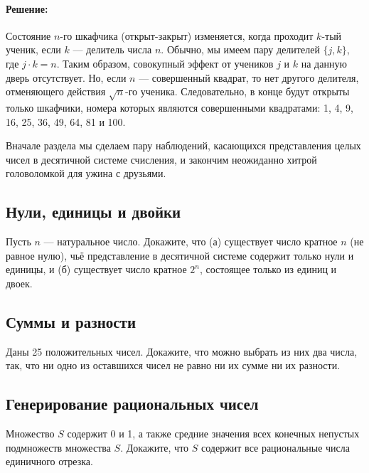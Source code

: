 \paragraph{Решение:}

Состояние $n$-го шкафчика (открыт-закрыт) изменяется, когда проходит $k$-тый ученик, если $k$ --- делитель числа $n$.
Обычно, мы имеем пару делителей $\{j,k\}$, где $j\cdot k=n$. 
Таким образом, совокупный эффект от учеников $j$ и $k$ на данную дверь отсутствует. %
Но, если $n$ --- совершенный квадрат, то нет другого делителя, отменяющего действия $\sqrt{n}$-го ученика. 
Следовательно, в конце будут открыты только шкафчики, номера которых являются совершенными квадратами: 1, 4, 9, 16, 25, 36, 49, 64, 81 и 100.\heart
 
Вначале раздела мы сделаем пару наблюдений, касающихся представления целых чисел в десятичной системе счисления, и закончим неожиданно хитрой головоломкой для ужина с друзьями. %

\subsection*{Нули, единицы и двойки}%

Пусть $n$ --- натуральное число. 
Докажите, что (а) существует число кратное $n$ (не равное нулю), чьё представление в десятичной системе содержит только нули и единицы, и
(б) существует число кратное $2^n$, состоящее только из единиц и двоек.

\subsection*{Суммы и разности} %

Даны 25 положительных чисел. 
Докажите, что можно выбрать из них два числа, так, что ни одно из оставшихся чисел не равно ни их сумме ни их разности.

\subsection*{Генерирование рациональных чисел}%

Множество $S$ содержит 0 и 1, а также средние значения всех конечных непустых подмножеств множества $S$. 
Докажите, что $S$ содержит все рациональные числа единичного отрезка.

